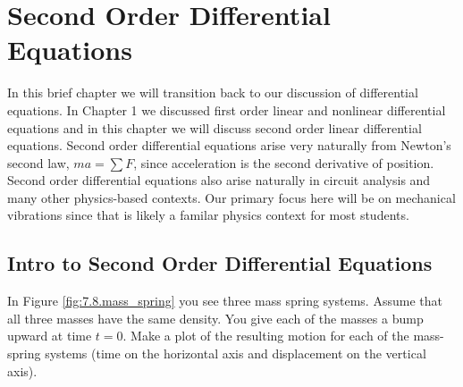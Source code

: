 \chapter{Second Order Differential Equations}
In this brief chapter we will transition back to our discussion of differential equations.
In Chapter 1 we discussed first order linear and nonlinear differential equations and in
this chapter we will discuss second order linear differential equations.  Second order
differential equations arise very naturally from Newton's second law, $ma = \sum F$, since
acceleration is the second derivative of position.  Second order differential equations
also arise naturally in circuit analysis and many other physics-based contexts.  Our
primary focus here will be on mechanical vibrations since that is likely a familar physics
context for most students.

\section{Intro to Second Order Differential Equations}
\begin{problem}
    In Figure \ref{fig:7.8.mass_spring} you see three mass spring systems.  Assume that
    all three masses have the same density.  You give each of the masses a bump
    upward at time $t=0$.  Make a plot of the resulting motion for each of the mass-spring
    systems (time on the horizontal axis and displacement on the vertical axis).  
\end{problem}

